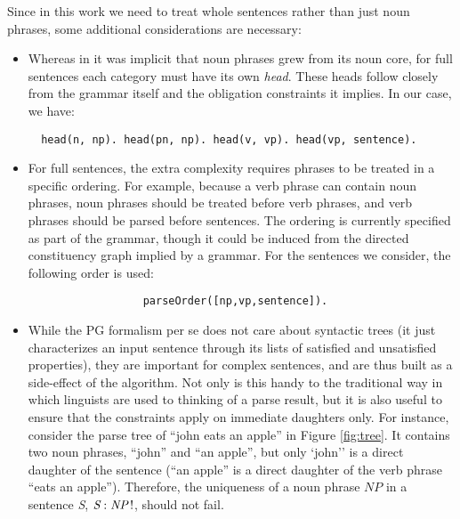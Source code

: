 \documentclass{llncs}
\newcommand{\uniqueness}[2]{\textit{#1} : \textit{#2}\,!}
\newcommand{\NP}{\textit{NP}\xspace}
\newcommand{\Se}{\textit{S}\xspace}
\begin{document}
Since in this work we need to treat whole sentences rather than just noun phrases, some additional considerations are necessary:
\begin{itemize}
  \item Whereas in \cite {DM12} it was implicit that noun phrases grew from its noun core, for full sentences each category must have its own \emph{head}. These heads follow closely from the grammar itself and the obligation constraints it implies. In our case, we have:
\begin{verbatim}  head(n, np). head(pn, np). head(v, vp). head(vp, sentence).\end{verbatim}
  
  \item For full sentences, the extra complexity requires phrases to be treated in a specific ordering. For example, because a verb phrase can contain noun phrases, noun phrases should be treated before verb phrases, and verb phrases should be parsed before sentences. The ordering is currently specified as part of the grammar, though it could be induced from the directed constituency graph implied by a grammar. For the sentences we consider, the following order is used:
\begin{verbatim}                  parseOrder([np,vp,sentence]).\end{verbatim}
  
  \item While the PG formalism per se does not care about syntactic trees (it just characterizes an input sentence through its lists of satisfied and unsatisfied properties), they are important for complex sentences, and are thus built as a side-effect of the algorithm. Not only is this handy to the traditional way in which linguists are used to thinking of a parse result, but it is also useful to ensure that the constraints apply on immediate daughters only. For instance, consider the parse tree of ``john eats an apple'' in Figure \ref{fig:tree}. It contains two noun phrases, ``john'' and ``an apple'', but only `john'' is a direct daughter of the sentence (``an apple'' is a direct daughter of the verb phrase ``eats an apple''). Therefore, the uniqueness of a noun phrase $\NP$ in a sentence \Se, $\uniqueness{\Se}{\NP}$, should not fail.


\end{itemize}
\end{document}
